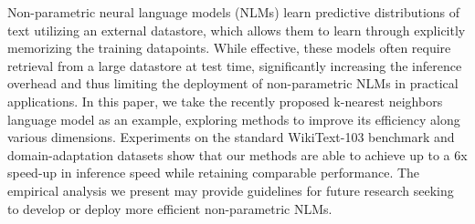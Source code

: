 Non-parametric neural language models (NLMs) learn predictive distributions of text utilizing an external datastore, which allows them to learn through explicitly memorizing the training datapoints. While effective, these models often require retrieval from a large datastore at test time, significantly increasing the inference overhead and thus limiting the deployment of non-parametric NLMs in practical applications. In this paper, we take the recently proposed k-nearest neighbors language model as an example, exploring methods to improve its efficiency along various dimensions. Experiments on the standard WikiText-103 benchmark and domain-adaptation datasets show that our methods are able to achieve up to a 6x speed-up in inference speed while retaining comparable performance. The empirical analysis we present may provide guidelines for future research seeking to develop or deploy more efficient non-parametric NLMs.
